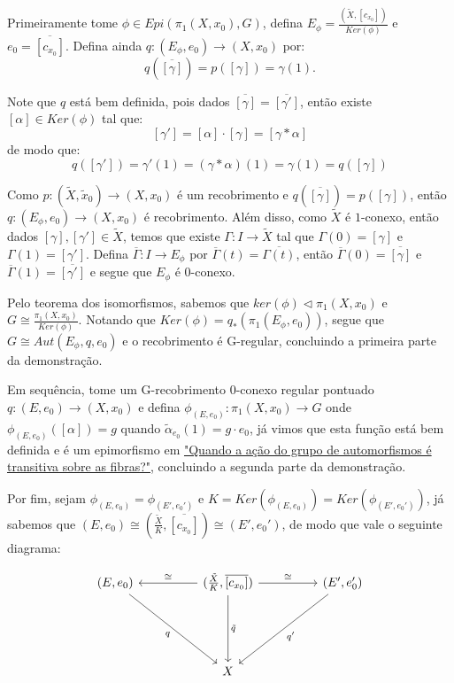 \begin{dem}
    Primeiramente tome $\phi \in Epi(\pi_1(X, x_0), G)$, defina $E_{\phi} = \frac{(\tilde X, [c_{x_0}])}{Ker(\phi)}$ e $e_0 = \overline{[c_{x_0}]}$. Defina ainda $q:(E_{\phi}, e_0) \longrightarrow (X, x_0)$ por: $$q(\overline{[\gamma]}) = p([\gamma]) = \gamma(1).$$

    Note que $q$ está bem definida, pois dados $\overline{[\gamma]} = \overline{[\gamma']}$, então existe $[\alpha] \in Ker(\phi)$ tal que: $$[\gamma'] = [\alpha] \cdot [\gamma] = [\gamma * \alpha]$$ de modo que: $$q([\gamma']) = \gamma'(1) = (\gamma * \alpha)(1) = \gamma(1) = q([\gamma])$$

    Como $p: (\tilde X, \tilde x_0) \longrightarrow (X, x_0)$ é um recobrimento e $q(\overline{[\gamma]}) = p([\gamma])$,  então $q:(E_{\phi}, e_0) \longrightarrow (X, x_0)$ é recobrimento. Além disso, como $\tilde X$ é $1$-conexo, então dados $[\gamma], [\gamma'] \in \tilde X$, temos que existe $\Gamma: I \longrightarrow \tilde X$ tal que $\Gamma(0) = [\gamma]$ e $\Gamma(1) = [\gamma']$. Defina $\overline{\Gamma}: I \longrightarrow E_{\phi}$ por $\overline{\Gamma}(t) = \overline{\Gamma(t)}$, então $\overline{\Gamma}(0) = \overline{[\gamma]}$ e $\overline{\Gamma}(1) = \overline{[\gamma']}$ e segue que $E_{\phi}$ é $0$-conexo.

    Pelo teorema dos isomorfismos, sabemos que $ker(\phi) \triangleleft \pi_1(X, x_0)$ e $G \cong \frac{\pi_1(X, x_0)}{Ker(\phi)}$. Notando que $Ker(\phi) = q_*(\pi_1(E_{\phi}, e_0))$, segue que $G \cong Aut(E_{\phi}, q, e_0)$ e o recobrimento é G-regular, concluindo a primeira parte da demonstração.

    Em sequência, tome um G-recobrimento $0$-conexo regular pontuado $q:(E, e_0) \longrightarrow (X, x_0)$ e defina $\phi_{(E, e_0)}: \pi_1(X, x_0) \longrightarrow G$ onde $\phi_{(E, e_0)}([\alpha]) = g$ quando $\tilde \alpha_{e_0}(1) = g \cdot e_0$, já vimos que esta função está bem definida e é um epimorfismo em \hyperref[acao-de-automorfismo-transitiva-prop]{"Quando a ação do grupo de automorfismos é transitiva sobre as fibras?"}, concluindo a segunda parte da demonstração.

    Por fim, sejam $\phi_{(E, e_0)} = \phi_{(E', e_0')}$ e $K = Ker(\phi_{(E, e_0)}) = Ker(\phi_{(E', e_0')})$, já sabemos que $(E, e_0) \cong (\frac{\tilde X}{K}, \overline{[c_{x_0}]}) \cong (E', e_0')$, de modo que vale o seguinte diagrama:

    \[\begin{tikzcd}
    	{(E,e_0)} && {(\frac{\tilde X}{K}, \overline{[c_{x_0}]})} && {(E', e_0')} \\
    	\\
    	\\
    	&& X
    	\arrow["q"', from=1-1, to=4-3]
    	\arrow["\cong"', from=1-3, to=1-1]
    	\arrow["\cong", from=1-3, to=1-5]
    	\arrow["{\tilde q}", from=1-3, to=4-3]
    	\arrow["{q'}", from=1-5, to=4-3]
    \end{tikzcd}\]


\end{dem}
